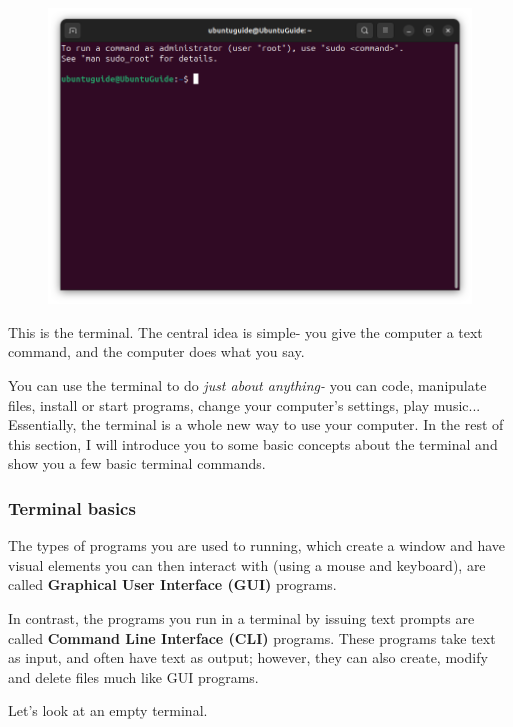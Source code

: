 \documentclass[12pt]{article}
\begin{document}
\begin{figure}[htp]
    \centering
    \includegraphics[width=\textwidth]{2-4.png}
\end{figure}

This is the terminal. The central idea is simple- you give the computer a text command, and the computer does what you say. 

You can use the terminal to do \textit{just about anything-} you can code, manipulate files, install or start programs, change your computer's settings, play music... Essentially, the terminal is a whole new way to use your computer. In the rest of this section, I will introduce you to some basic concepts about the terminal and show you a few basic terminal commands.

\subsubsection{Terminal basics}

The types of programs you are used to running, which create a window and have visual elements you can then interact with (using a mouse and keyboard), are called \textbf{Graphical User Interface (GUI)} programs. 

In contrast, the programs you run in a terminal by issuing text prompts are called \textbf{Command Line Interface (CLI)} programs. These programs take text as input, and often have text as output; however, they can also create, modify and delete files much like GUI programs.

Let's look at an empty terminal.
\end{document}
